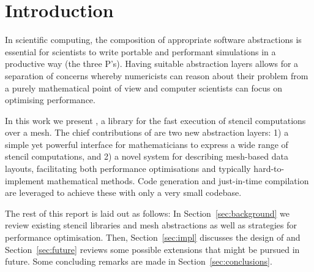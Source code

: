 \section{Introduction}

In scientific computing, the composition of appropriate software abstractions is essential for scientists to write portable and performant simulations in a productive way (the three P's).
Having suitable abstraction layers allows for a separation of concerns whereby numericists can reason about their problem from a purely mathematical point of view and computer scientists can focus on optimising performance.

In this work we present , a library for the fast execution of stencil computations over a mesh.
The chief contributions of  are two new abstraction layers:
1) a simple yet powerful interface for mathematicians to express a wide range of stencil computations,
and 2) a novel system for describing mesh-based data layouts, facilitating both performance optimisations and typically hard-to-implement mathematical methods.
Code generation and just-in-time compilation are leveraged to achieve these with only a very small codebase.

The rest of this report is laid out as follows:
In Section~\ref{sec:background} we review existing stencil libraries and mesh abstractions as well as strategies for performance optimisation.
Then, Section~\ref{sec:impl} discusses the design of  and Section~\ref{sec:future} reviews some possible extensions that might be pursued in future.
Some concluding remarks are made in Section~\ref{sec:conclusions}.
